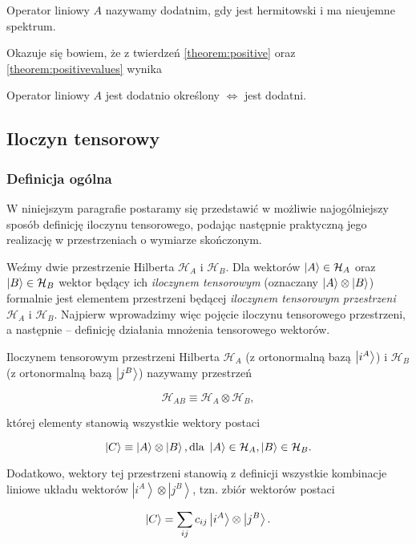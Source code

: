 \begin{definition}
    Operator liniowy $A$ nazywamy dodatnim, gdy jest hermitowski i ma nieujemne spektrum.
\end{definition}

Okazuje się bowiem, że z twierdzeń \ref{theorem:positive} oraz \ref{theorem:positivevalues}  wynika

\begin{corollary}
    \label{corollary:iff}
    Operator liniowy $A$ jest dodatnio określony $\Longleftrightarrow$ jest dodatni.
\end{corollary}

\subsection{Iloczyn tensorowy}

\subsubsection{Definicja ogólna}

W niniejszym paragrafie postaramy się przedstawić w możliwie najogólniejszy sposób definicję iloczynu tensorowego, podając następnie praktyczną jego realizację w przestrzeniach o wymiarze skończonym.

Weźmy dwie przestrzenie Hilberta $\mathcal{H}_{A}$ i $\mathcal{H}_{B}$. Dla wektorów $\ket{A} \in \mathcal{H}_{A}$ oraz $\ket{B} \in \mathcal{H}_{B}$ wektor będący ich \textit{iloczynem tensorowym} (oznaczany $\ket{A} \otimes \ket{B}$) formalnie jest elementem przestrzeni będącej \textit{iloczynem tensorowym przestrzeni} $\mathcal{H}_{A}$ i $\mathcal{H}_{B}$. Najpierw wprowadzimy więc pojęcie iloczynu tensorowego przestrzeni, a następnie -- definicję działania mnożenia tensorowego wektorów.

\begin{definition}
    Iloczynem tensorowym przestrzeni Hilberta $\mathcal{H}_A$ (z ortonormalną bazą $\ket{i^{A}}$) i $\mathcal{H}_B$ (z ortonormalną bazą $\ket{j^{B}}$) nazywamy przestrzeń

    $$
        \mathcal{H}_{AB} \equiv \mathcal{H}_A \otimes \mathcal{H}_B,
    $$

    której elementy stanowią wszystkie wektory postaci

    \begin{equation}
        \label{equation:product}
        \ket{C} \equiv \ket{A} \otimes \ket{B}, \textrm{dla } \ket{A} \in \mathcal{H}_A, \ket{B} \in \mathcal{H}_B.
    \end{equation}

    Dodatkowo, wektory tej przestrzeni stanowią z definicji wszystkie kombinacje liniowe układu wektorów $\left|i^{A}\right\rangle\otimes\left|j^{B}\right\rangle$, tzn. zbiór wektorów postaci

    \begin{equation}
        \label{equation:entangled}
        \ket{C} = \sum\limits_{ij} c_{ij} \ket{i ^ {A}} \otimes \ket{j ^ {B}}.
    \end{equation}
\end{definition}

